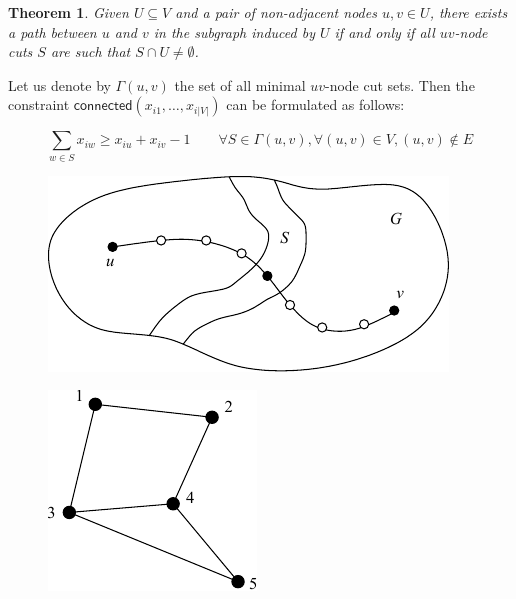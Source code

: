 \documentclass[]{article}
\newtheorem{theorem}{Theorem}
\begin{document}
\begin{theorem}
Given $U \subseteq V$ and a pair of non-adjacent nodes $u, v \in U$, there exists a path between $u$ and $v$ in the subgraph induced by $U$ if and only if all $uv$-node cuts $S$ are such that $S \cap U \neq \emptyset$.
\end{theorem}

Let us denote by $\Gamma(u, v)$ the set of all minimal $uv$-node cut sets. Then the constraint $\mathsf{connected}(x_{i1}, \ldots, x_{i|V|})$ can be formulated as follows:

\begin{equation}
\sum_{w \in S} x_{iw} \geq x_{iu} + x_{iv} - 1 \qquad \forall S \in \Gamma(u, v), \forall (u, v) \in V, (u, v) \notin E
\label{eq:connectivity}
\end{equation}

\begin{figure}
\centering
\begin{minipage}{.5\textwidth}
\centering
\includegraphics[scale=0.8]{node_cut}
\label{fig:nodecut}
\end{minipage}%
\begin{minipage}{.5\textwidth}
\centering
\includegraphics[scale=0.8]{minimal}
\label{fig:minimal}
\end{minipage}
\end{figure}
\end{document}

